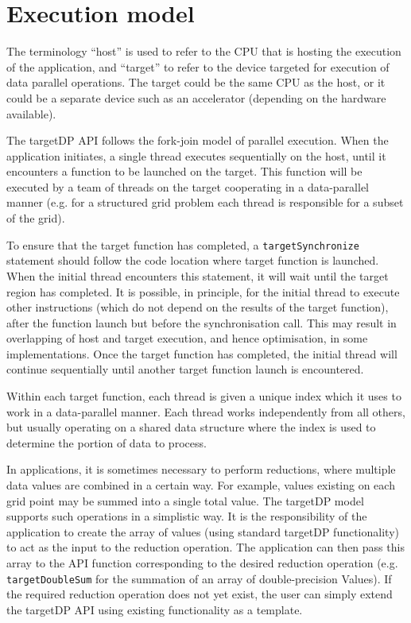 \chapter{Execution model}

The terminology ``host'' is used to refer to the CPU that is hosting
the execution of the application, and ``target'' to refer to the
device targeted for execution of data parallel operations. The target
could be the same CPU as the host, or it could be a separate device such
as an accelerator (depending on the hardware available). 

The targetDP API follows the fork-join model of parallel
execution. When the application initiates, a single thread executes
sequentially on the host, until it encounters a function to be
launched on the target. This function will be executed by a team of
threads on the target cooperating in a data-parallel manner (e.g. for
a structured grid problem each thread is responsible for a subset of
the grid). 

To ensure that the target function has completed, a
\verb+targetSynchronize+ statement should follow the code location
where target function is launched. When the initial thread encounters
this statement, it will wait until the target region has completed. It
is possible, in principle, for the initial thread to execute other instructions
(which do not depend on the results of the target function), after the
function launch but before the synchronisation call. This may result in
overlapping of host and target execution, and hence optimisation, in
some implementations. Once the target function has completed, the
initial thread will continue sequentially until another target
function launch is encountered.

Within each target function, each thread is given a unique index which
it uses to work in a data-parallel manner. Each thread works
independently from all others, but usually operating on a shared data
structure where the index is used to determine the portion of data
to process.

In applications, it is sometimes necessary to perform reductions,
where multiple data values are combined in a certain way. For example,
values existing on each grid point may be summed into a single total
value. The targetDP model supports such operations in a simplistic
way. It is the responsibility of the application to create the array
of values (using standard targetDP functionality) to act as the input
to the reduction operation. The application can then pass this array
to the API function corresponding to the desired reduction operation
(e.g. \verb+targetDoubleSum+ for the summation of an array of
double-precision Values). If the required reduction operation does not yet
exist, the user can simply extend the targetDP API using existing
functionality as a template.
